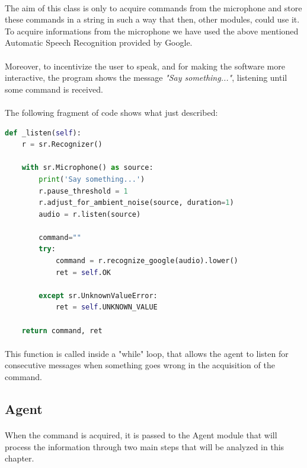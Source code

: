 \documentclass[12pt, a4paper]{article}
\begin{document}
\paragraph{}
The aim of this class is only to acquire commands from the microphone and store these commands in a string in such a way that then, other modules, could use it. To acquire informations from the microphone we have used the above mentioned Automatic Speech Recognition provided by Google. 
\paragraph{}
Moreover, to incentivize the user to speak, and for making the software more interactive, the program shows the message \textit{"Say something..."}, listening until some command is received.
\paragraph{}
The following fragment of code shows what just described:
\vspace{1em}
\begin{lstlisting}[language=Python, caption=The function that actually listens to the user and returns a string of text]
def _listen(self):
	r = sr.Recognizer()
	
	with sr.Microphone() as source:
		print('Say something...')
		r.pause_threshold = 1
		r.adjust_for_ambient_noise(source, duration=1)
		audio = r.listen(source)
		
		command=""
		try:
			command = r.recognize_google(audio).lower()
			ret = self.OK
		
		except sr.UnknownValueError:
			ret = self.UNKNOWN_VALUE
	
	return command, ret
\end{lstlisting}
\paragraph{}
This function is called inside a "while" loop, that allows the agent to listen for consecutive messages when something goes wrong in the acquisition of the command.
\subsection{Agent}
\paragraph{}
When the command is acquired, it is passed to the Agent module that will process the information through two main steps that will be analyzed in this chapter.
\end{document}
